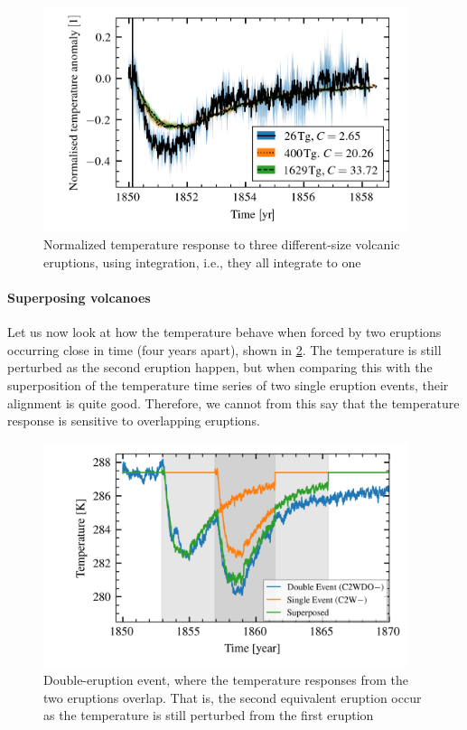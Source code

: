 \documentclass{ametsocV5}
\begin{document}
\begin{figure}
  \begin{center}
    \includegraphics[width=0.95\textwidth]{figures/compare-waveform-integrate.png}
  \end{center}
  \caption{Normalized temperature response to three different-size volcanic eruptions,
    using integration, i.e., they all integrate to one}
  \label{fig:temp_norm_int}
\end{figure}

\paragraph*{Superposing volcanoes}

Let us now look at how the temperature behave when forced by two eruptions occurring
close in time (four years apart), shown in \cref{fig:double-overlap-superpose}. The
temperature is still perturbed as the second eruption happen, but when comparing this
with the superposition of the temperature time series of two single eruption events,
their alignment is quite good. Therefore, we cannot from this say that the temperature
response is sensitive to overlapping eruptions.

\begin{figure}
  \begin{center}
    \includegraphics[width=0.95\textwidth]{figures/double-overlap-superpose.png}
  \end{center}
  \caption{Double-eruption event, where the temperature responses from the two eruptions
    overlap. That is, the second equivalent eruption occur as the temperature is still
    perturbed from the first eruption}
  \label{fig:double-overlap-superpose}
\end{figure}
\end{document}
